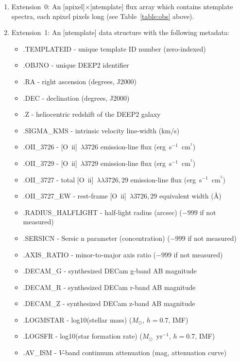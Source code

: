 \documentclass[12pt]{article}
\newcommand{\oii}{[O~{\sc ii}]}
\newcommand{\oiilam}{[O~{\sc ii}]~\ensuremath{\lambda\lambda3726,29}}
\begin{document}
\begin{enumerate}
\item{Extension~0: An [{\sc npixel}]$\times$[{\sc ntemplate}] flux
  array which contains {\sc ntemplate} spectra, each {\sc npixel}
  pixels long (see Table~\ref{table:obs} above).}
\item{Extension~1: An [{\sc ntemplate}] data structure with the
  following metadata:
\begin{itemize}
\item{.{\sc TEMPLATEID} - unique template ID number (zero-indexed)}
\item{.{\sc OBJNO} - unique DEEP2 identifier}
\item{.{\sc RA} - right ascension (degrees, J2000)}
\item{.{\sc DEC} - declination (degrees, J2000)}
\item{.{\sc Z} - heliocentric redshift of the DEEP2 galaxy} 
\item{.{\sc SIGMA\_KMS} - intrinsic velocity line-width (km/s)} 
\item{.{\sc OII\_3726} - \oii~$\lambda3726$ emission-line flux
  (erg~s$^{-1}$~cm$^{^2}$)}  
\item{.{\sc OII\_3729} - \oii~$\lambda3729$ emission-line flux
  (erg~s$^{-1}$~cm$^{^2}$)} 
\item{.{\sc OII\_3727} - total \oiilam{} emission-line flux
  (erg~s$^{-1}$~cm$^{^2}$)} 
\item{.{\sc OII\_3727\_EW} - rest-frame \oii~$\lambda3726,29$
  equivalent width (\AA)}
\item{.{\sc RADIUS\_HALFLIGHT} - half-light radius (arcsec) ($-999$ if not measured)}
\item{.{\sc SERSICN} - Sersic n parameter (concentration) ($-999$ if not measured)}
\item{.{\sc AXIS\_RATIO} - minor-to-major axis ratio ($-999$ if not measured)}
\item{.{\sc DECAM\_G} - synthesized DECam g-band AB magnitude}
\item{.{\sc DECAM\_R} - synthesized DECam r-band AB magnitude}
\item{.{\sc DECAM\_Z} - synthesized DECam z-band AB magnitude}
\item{.{\sc LOGMSTAR} - log10(stellar mass) ($M_{\odot}$, $h=0.7$,
  \citealt{chabrier03a} IMF)} 
\item{.{\sc LOGSFR} - log10(star formation rate)
  ($M_{\odot}$~yr$^{-1}$, $h=0.7$, \citealt{chabrier03a} IMF)}
\item{.{\sc AV\_ISM} - $V$-band continuum attenuation (mag,
  \citealt{charlot00a} attenuation curve)} 
\end{itemize}
}
\end{enumerate}
\end{document}
